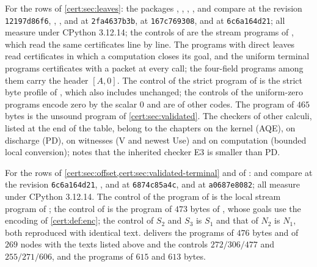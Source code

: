 For the rows of \cref{cert:sec:leaves}: the packages ,
, ,
,  and
 compare at the revision \texttt{12197d86f6},
, ,
 and  at
\texttt{2fa4637b3b},  at
\texttt{167c769308}, and  at
\texttt{6c6a164d21}; all measure under CPython 3.12.14; the controls of  are the
stream programs of , which read the same certificates
line by line. The programs with direct leaves read certificates in which a
computation closes its goal, and the uniform terminal programs certificates
with a packet at every call; the four-field programs among them carry the
header $[A,0]$. The control of the strict program of 
is the strict byte profile of , which
 also includes unchanged; the controls of the uniform-zero
programs encode zero by the scalar $0$ and are of other codes. The program of
$465$ bytes is the unsound program of \cref{cert:sec:validated}. The checkers
of other calculi, listed at the end of the table, belong to the chapters on
the kernel (AQE), on discharge (PD), on witnesses (V and newest Use) and on
computation (bounded local conversion);  notes
that the inherited checker E3 is smaller than PD.

For the rows of \cref{cert:sec:offset,cert:sec:validated-terminal} and of
:  and 
compare at the revision \texttt{6c6a164d21}, ,
 and  at
\texttt{6874c85a4c}, and  at \texttt{a0687e8082}; all
measure under CPython 3.12.14. The control of the program of
 is the local stream program of
; the control of  is the program of $473$ bytes
of , whose goals use the encoding of
\cref{cert:def:enc}; the control of $S_2$ and $S_3$ is $S_1$ and that of $N_2$
is $N_1$, both reproduced with identical text. 
delivers the programs of $476$ bytes and of $269$ nodes with the texts listed
above and the controls $272/306/477$ and $255/271/606$, and 
the programs of $615$ and $613$ bytes.

